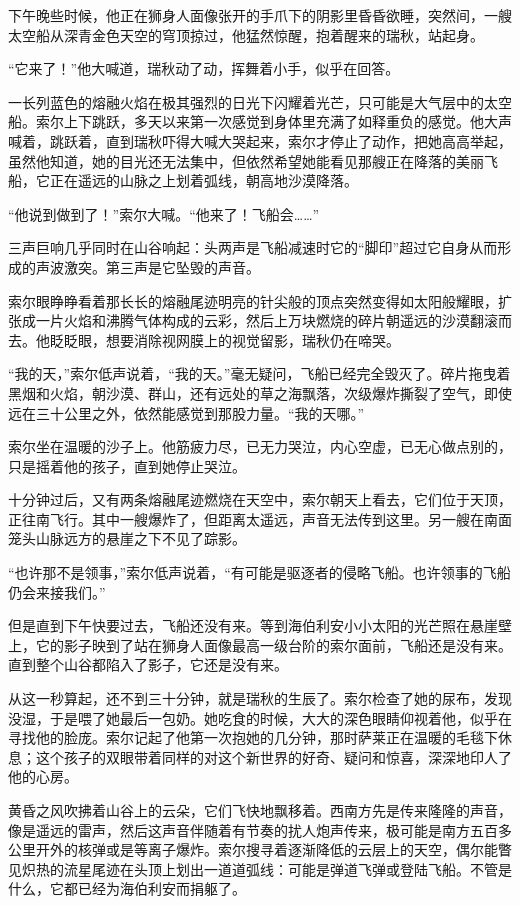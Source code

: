 \documentclass[AutoFakeBold=true]{book}
\begin{document}
下午晚些时候，他正在狮身人面像张开的手爪下的阴影里昏昏欲睡，突然间，一艘太空船从深青金色天空的穹顶掠过，他猛然惊醒，抱着醒来的瑞秋，站起身。

``它来了！''他大喊道，瑞秋动了动，挥舞着小手，似乎在回答。

一长列蓝色的熔融火焰在极其强烈的日光下闪耀着光芒，只可能是大气层中的太空船。索尔上下跳跃，多天以来第一次感觉到身体里充满了如释重负的感觉。他大声喊着，跳跃着，直到瑞秋吓得大喊大哭起来，索尔才停止了动作，把她高高举起，虽然他知道，她的目光还无法集中，但依然希望她能看见那艘正在降落的美丽飞船，它正在遥远的山脉之上划着弧线，朝高地沙漠降落。

``他说到做到了！''索尔大喊。``他来了！飞船会……''

三声巨响几乎同时在山谷响起：头两声是飞船减速时它的``脚印''超过它自身从而形成的声波激突。第三声是它坠毁的声音。

索尔眼睁睁看着那长长的熔融尾迹明亮的针尖般的顶点突然变得如太阳般耀眼，扩张成一片火焰和沸腾气体构成的云彩，然后上万块燃烧的碎片朝遥远的沙漠翻滚而去。他眨眨眼，想要消除视网膜上的视觉留影，瑞秋仍在啼哭。

``我的天，''索尔低声说着，``我的天。''毫无疑问，飞船已经完全毁灭了。碎片拖曳着黑烟和火焰，朝沙漠、群山，还有远处的草之海飘落，次级爆炸撕裂了空气，即使远在三十公里之外，依然能感觉到那股力量。``我的天哪。''

索尔坐在温暖的沙子上。他筋疲力尽，已无力哭泣，内心空虚，已无心做点别的，只是摇着他的孩子，直到她停止哭泣。

十分钟过后，又有两条熔融尾迹燃烧在天空中，索尔朝天上看去，它们位于天顶，正往南飞行。其中一艘爆炸了，但距离太遥远，声音无法传到这里。另一艘在南面笼头山脉远方的悬崖之下不见了踪影。

``也许那不是领事，''索尔低声说着，``有可能是驱逐者的侵略飞船。也许领事的飞船仍会来接我们。''

但是直到下午快要过去，飞船还没有来。等到海伯利安小小太阳的光芒照在悬崖壁上，它的影子映到了站在狮身人面像最高一级台阶的索尔面前，飞船还是没有来。直到整个山谷都陷入了影子，它还是没有来。

从这一秒算起，还不到三十分钟，就是瑞秋的生辰了。索尔检查了她的尿布，发现没湿，于是喂了她最后一包奶。她吃食的时候，大大的深色眼睛仰视着他，似乎在寻找他的脸庞。索尔记起了他第一次抱她的几分钟，那时萨莱正在温暖的毛毯下休息；这个孩子的双眼带着同样的对这个新世界的好奇、疑问和惊喜，深深地印人了他的心房。

黄昏之风吹拂着山谷上的云朵，它们飞快地飘移着。西南方先是传来隆隆的声音，像是遥远的雷声，然后这声音伴随着有节奏的扰人炮声传来，极可能是南方五百多公里开外的核弹或是等离子爆炸。索尔搜寻着逐渐降低的云层上的天空，偶尔能瞥见炽热的流星尾迹在头顶上划出一道道弧线：可能是弹道飞弹或登陆飞船。不管是什么，它都已经为海伯利安而捐躯了。
\end{document}
